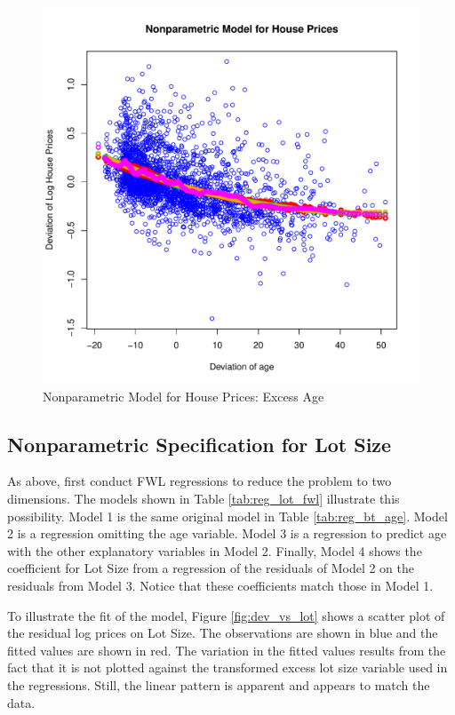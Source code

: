 \begin{figure}[h!]
  \centering
  \includegraphics[scale = 0.5, keepaspectratio=true]{../Figures/dev_np_vs_age_dev_bw}
  \caption{Nonparametric Model for House Prices: Excess Age} \label{fig:dev_np_vs_age_dev_bw}
\end{figure}





\clearpage
\subsection{Nonparametric Specification for Lot Size}

As above, first conduct FWL regressions 
to reduce the problem to two dimensions. 
The models shown in
Table \ref{tab:reg_lot_fwl}
illustrate this possibility. 
Model 1 is the same original model in 
Table \ref{tab:reg_bt_age}. 
Model 2 is a regression omitting the age variable. 
Model 3 is a regression to predict age with the other explanatory variables in Model 2.
Finally, Model 4 shows the coefficient for Lot Size
from a regression of the residuals of Model 2
on the residuals from Model 3. 
Notice that these coefficients match those in Model 1. 



\pagebreak 
To illustrate the fit of the model, 
Figure \ref{fig:dev_vs_lot} shows a scatter plot 
of the residual log prices on Lot Size. 
The observations are shown in blue
and the fitted values are shown in red.
The variation in the fitted values results from the 
fact that it is not plotted against the transformed excess lot size variable used in the regressions.
Still, the linear pattern is apparent
and appears to match the data. 

